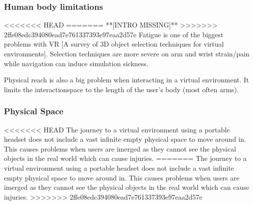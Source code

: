 \subsubsection{Human body limitations}
<<<<<<< HEAD
=======
**[INTRO MISSING]**
>>>>>>> 2ffe08edc394080ead7e761337393e97eaa2d57e
Fatigue is one of the biggest problems with VR [A survey of 3D object selection techniques for virtual environments].
Selection techniques are more severe on arm and wrist strain/pain while navigation can induce simulation sickness.

Physical reach is also a big problem when interacting in a virtual environment. It limits the interactionspace to the length of the user's body (most often arms).

\subsubsection{Physical Space}
<<<<<<< HEAD
The journey to a virtual environment using a portable headset does not include a vast infinite empty physical space to move around in. This causes problems when users are imerged as they cannot see the physical objects in the real world which can cause injuries. 
=======
The journey to a virtual environment using a portable headset does not include a vast infinite empty physical space to move around in. This causes problems when users are imerged as they cannot see the physical objects in the real world which can cause injuries.
>>>>>>> 2ffe08edc394080ead7e761337393e97eaa2d57e
